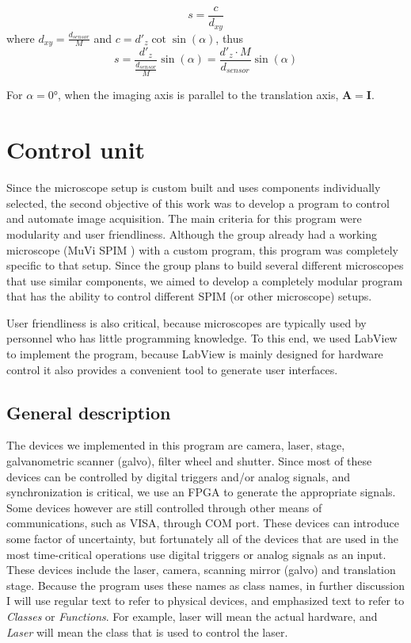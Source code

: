 \documentclass{tdk_style}
\begin{document}
\begin{equation}
s = \frac{c}{d_{xy}}
\end{equation}
where $d_{xy} = \frac{d_{sensor}}{M}$ and $c=d'_z\cot \sin(\alpha)$, thus
\begin{equation}
s = \frac{d'_z}{\frac{d_{sensor}}{M}} \sin(\alpha) = \frac{d'_z \cdot M}{d_{sensor}} \sin(\alpha)
\end{equation}

For $\alpha = 0°$, when the imaging axis is parallel to the translation axis, $\mathbf{A=I}$.


\chapter{Control unit}
\label{chap3}

Since the microscope setup is custom built and uses components individually selected, the second objective of this work was to develop a program to control and automate image acquisition. The main criteria for this program were modularity and user friendliness. Although the group already had a working microscope (MuVi SPIM \cite{krzic_multiview_2012}) with a custom program, this program was completely specific to that setup. Since the group plans to build several different microscopes that use similar components, we aimed to develop a completely modular program that has the ability to control different SPIM (or other microscope) setups.

User friendliness is also critical, because microscopes are typically used by personnel who has little programming knowledge. To this end, we used LabView to implement the program, because LabView is mainly designed for hardware control it also provides a convenient tool to generate user interfaces.


\section{General description}
The devices we implemented in this program are camera, laser, stage, galvanometric scanner (galvo), filter wheel and shutter. Since most of these devices can be controlled by digital triggers and/or analog signals, and  synchronization is critical, we use an FPGA to generate the appropriate signals. Some devices however are still controlled through other means of communications, such as VISA, through COM port. These devices can introduce some factor of uncertainty, but fortunately all of the devices that are used in the most time-critical operations use digital triggers or analog signals as an input. These devices include the laser, camera, scanning mirror (galvo) and translation stage. Because the program uses these names as class names, in further discussion I will use regular text to refer to physical devices, and emphasized text to refer to \emph{Classes} or \emph{Functions}. For example, laser will mean the actual hardware, and \emph{Laser} will mean the class that is used to control the laser.
\end{document}
